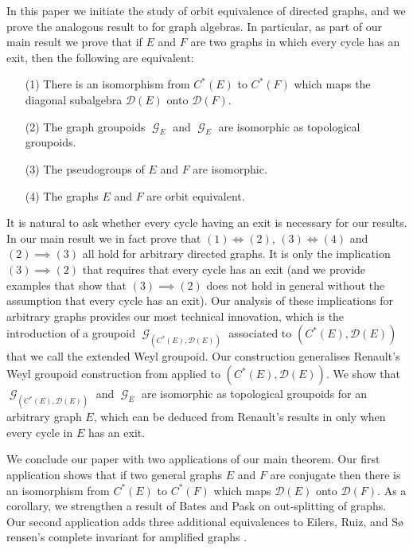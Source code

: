 \documentclass[12pt, a4paper]{amsart}
\numberwithin{equation}{section}
\theoremstyle{definition}
\theoremstyle{remark}
\begin{document}
In this paper we initiate the study of orbit equivalence of directed graphs, 
and we prove the analogous result to \cite[Proposition 4.13]{Ren2} for graph 
algebras. In particular, as part of our main result we prove that if $E$ and 
$F$ are two graphs in which every cycle has an exit, then the following are 
equivalent:
\begin{enumerate}
\item[(1)] There is an isomorphism from $C^*(E)$ to $C^*(F)$ which maps the 
diagonal subalgebra $\mathcal{D}(E)$ onto $\mathcal{D}(F)$.
\item[(2)] The graph groupoids ${\operatorname{\mathcal{G}}}_E$ and ${\operatorname{\mathcal{G}}}_E$ are isomorphic as 
topological groupoids.
\item[(3)] The pseudogroups of $E$ and $F$ are isomorphic.
\item[(4)] The graphs $E$ and $F$ are orbit equivalent.
\end{enumerate}

It is natural to ask whether every cycle having an exit is necessary for our 
results. In our main result we in fact prove that $(1)\iff (2)$, $(3)\iff (4)$ 
and $(2)\implies (3)$ all hold for arbitrary directed graphs. It is only the 
implication $(3)\implies (2)$ that requires that every cycle has an exit (and we provide examples that show that $(3)\implies (2)$ does not hold in general without the assumption that every cycle has an exit). Our 
analysis of these implications for arbitrary graphs provides our most technical 
innovation, which 
is the introduction of a groupoid ${\operatorname{\mathcal{G}}}_{(C^*(E),{\mathcal{D}}(E))}$ associated to 
$(C^*(E),{\mathcal{D}}(E))$ that we call the extended Weyl groupoid. Our construction 
generalises Renault's Weyl groupoid construction from 
\cite[Definition~4.11]{Ren2} applied to $(C^*(E),{\mathcal{D}}(E))$. We show that 
${\operatorname{\mathcal{G}}}_{(C^*(E),{\mathcal{D}}(E))}$ and ${\operatorname{\mathcal{G}}}_E$ are isomorphic as topological groupoids 
for an arbitrary graph $E$, which can be deduced from 
Renault's results in \cite{Ren2} only when every cycle in $E$ has an exit.   

We conclude our paper with two applications of our main theorem. Our 
first application shows that if two general graphs $E$ and $F$ are conjugate 
then there is an isomorphism from $C^*(E)$ to $C^*(F)$ which maps 
$\mathcal{D}(E)$ onto $\mathcal{D}(F)$. As a corollary, we strengthen a result 
of Bates and Pask \cite[Theorem 3.2]{BP} on out-splitting of graphs. Our 
second application adds three additional equivalences to Eilers, Ruiz, and S\o 
rensen's complete invariant for amplified graphs \cite[Theorem 1.1]{ERS}. 
\end{document}

